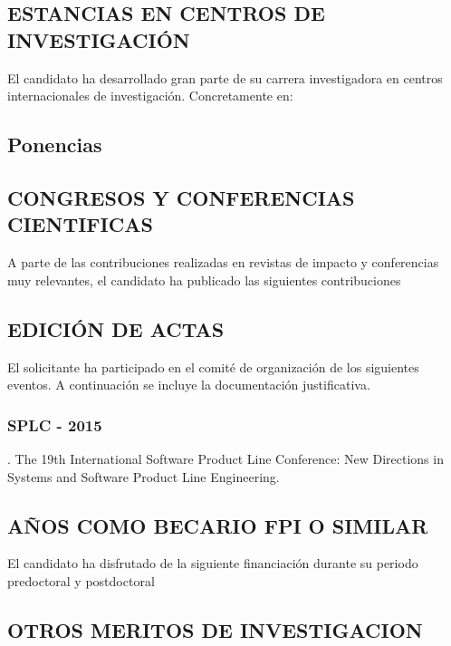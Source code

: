 \subsection{ESTANCIAS EN CENTROS DE INVESTIGACIÓN}
El candidato ha desarrollado gran parte de su carrera investigadora en centros internacionales de investigación. Concretamente en:\\
\startitems
\printStays 
\stopitems

\subsection{Ponencias}
\label{ponencias}
\newpage

\subsection{CONGRESOS Y CONFERENCIAS CIENTIFICAS}
A parte de las contribuciones realizadas en revistas de impacto y conferencias muy relevantes, el candidato ha publicado las siguientes contribuciones\\
\startitems
{}   
\stopitems
 

\subsection{EDICIÓN DE ACTAS}

El solicitante ha participado en el comité de organización de los siguientes eventos. A continuación se incluye la documentación justificativa.
\subsubsection{SPLC - 2015}. The 19th International Software Product Line Conference: New Directions in Systems and Software Product Line Engineering.

\subsection{AÑOS COMO BECARIO FPI O SIMILAR}
El candidato ha disfrutado de la siguiente financiación durante su periodo predoctoral y postdoctoral\\
\startitems
{}
\stopitems

 
\subsection{OTROS MERITOS DE INVESTIGACION}
